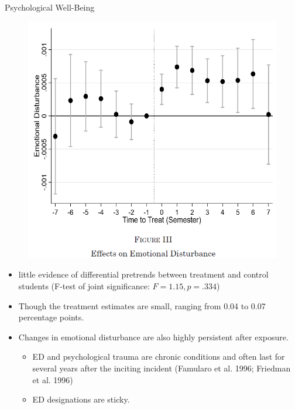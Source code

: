 \documentclass[dvipdfmx]{beamer}
\begin{document}
\begin{frame}{Psychological Well-Being}
  \begin{figure}
    \centering
    \includegraphics[scale = .55]{fig_tab/os20220113/F3}
  \end{figure}
\end{frame}

\begin{frame}{}
  \begin{itemize}
    \item little evidence of differential pretrends between treatment and control students (F-test of joint significance: $F = 1.15, p = .334$)
    \item Though the treatment estimates are small, ranging from 0.04 to 0.07 percentage points.
    \item Changes in emotional disturbance are also highly persistent after exposure.
    \begin{itemize}
      \item ED and psychological trauma are chronic conditions and often last for several years after the inciting incident (Famularo et al. 1996; Friedman et al. 1996)
      \item ED designations are sticky.
    \end{itemize}
  \end{itemize}
\end{frame}
\end{document}
